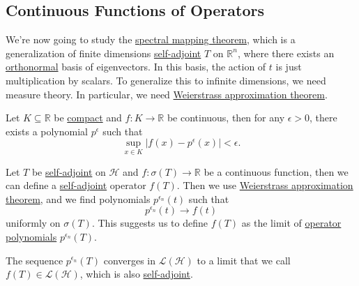 \subsection{Continuous Functions of Operators}
We're now going to study the \hyperref[thm:spectral-mapping]{spectral mapping theorem}, which is a generalization of finite dimensions \hyperref[def:self-adjoint-op]{self-adjoint} \(T\) on \(\mathbb{R} ^n\), where there exists an \hyperref[def:orthonormal-system]{orthonormal} basis of eigenvectors. In this basis, the action of \(t\) is just multiplication by scalars. To generalize this to infinite dimensions, we need measure theory. In particular, we need \hyperref[thm:Weierstrass-approximation]{Weierstrass approximation theorem}.

\begin{theorem}\label{thm:Weierstrass-approximation}
	Let \(K \subseteq \mathbb{R} \) be \hyperref[def:compact]{compact} and \(f\colon K \to \mathbb{R} \) be continuous, then for any \(\epsilon > 0\), there exists a polynomial \(p^{\epsilon } \) such that
	\[
		\sup_{x\in K} \vert f(x) - p^{\epsilon }(x)  \vert < \epsilon .
	\]
\end{theorem}

Let \(T\) be \hyperref[def:self-adjoint-op]{self-adjoint} on \(\mathcal{H} \) and \(f\colon \sigma (T) \to \mathbb{R} \) be a continuous function, then we can define a \hyperref[def:self-adjoint-op]{self-adjoint} operator \(f(T)\). Then we use \hyperref[thm:Weierstrass-approximation]{Weierstrass approximation theorem}, and we find polynomials \(p^{\epsilon _n}(t)\) such that
\[
	p^{\epsilon _n}(t) \to f(t)
\]
uniformly on \(\sigma (T)\). This suggests us to define \(f(T)\) as the limit of \hyperref[def:polynomial-op]{operator polynomials} \(p^{\epsilon _n}(T)\).

\begin{definition}\label{def:continuous-function-op}
	The sequence \(p^{\epsilon _n}(T)\) converges in \(\mathcal{L} (\mathcal{H} )\) to a limit that we call \(f(T)\in \mathcal{L} (\mathcal{H} )\), which is also \hyperref[def:self-adjoint-op]{self-adjoint}.
\end{definition}

